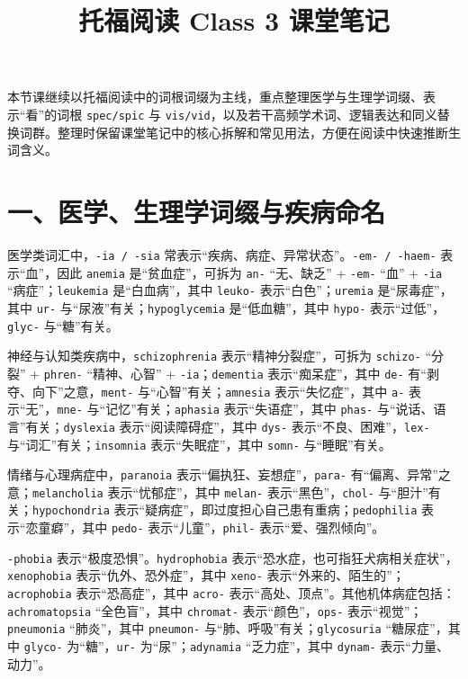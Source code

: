 \documentclass[UTF8,zihao=-4]{ctexart}
\title{\heiti 托福阅读 Class 3 课堂笔记}
\author{}
\date{}
\begin{document}
\maketitle
\thispagestyle{fancy}

本节课继续以托福阅读中的词根词缀为主线，重点整理医学与生理学词缀、表示“看”的词根 \texttt{spec/spic} 与 \texttt{vis/vid}，以及若干高频学术词、逻辑表达和同义替换词群。整理时保留课堂笔记中的核心拆解和常见用法，方便在阅读中快速推断生词含义。

\section*{一、医学、生理学词缀与疾病命名}

医学类词汇中，\texttt{-ia / -sia} 常表示“疾病、病症、异常状态”。\texttt{-em- / -haem-} 表示“血”，因此 \texttt{anemia} 是“贫血症”，可拆为 \texttt{an-} “无、缺乏” + \texttt{-em-} “血” + \texttt{-ia} “病症”；\texttt{leukemia} 是“白血病”，其中 \texttt{leuko-} 表示“白色”；\texttt{uremia} 是“尿毒症”，其中 \texttt{ur-} 与“尿液”有关；\texttt{hypoglycemia} 是“低血糖”，其中 \texttt{hypo-} 表示“过低”，\texttt{glyc-} 与“糖”有关。

神经与认知类疾病中，\texttt{schizophrenia} 表示“精神分裂症”，可拆为 \texttt{schizo-} “分裂” + \texttt{phren-} “精神、心智” + \texttt{-ia}；\texttt{dementia} 表示“痴呆症”，其中 \texttt{de-} 有“剥夺、向下”之意，\texttt{ment-} 与“心智”有关；\texttt{amnesia} 表示“失忆症”，其中 \texttt{a-} 表示“无”，\texttt{mne-} 与“记忆”有关；\texttt{aphasia} 表示“失语症”，其中 \texttt{phas-} 与“说话、语言”有关；\texttt{dyslexia} 表示“阅读障碍症”，其中 \texttt{dys-} 表示“不良、困难”，\texttt{lex-} 与“词汇”有关；\texttt{insomnia} 表示“失眠症”，其中 \texttt{somn-} 与“睡眠”有关。

情绪与心理病症中，\texttt{paranoia} 表示“偏执狂、妄想症”，\texttt{para-} 有“偏离、异常”之意；\texttt{melancholia} 表示“忧郁症”，其中 \texttt{melan-} 表示“黑色”，\texttt{chol-} 与“胆汁”有关；\texttt{hypochondria} 表示“疑病症”，即过度担心自己患有重病；\texttt{pedophilia} 表示“恋童癖”，其中 \texttt{pedo-} 表示“儿童”，\texttt{phil-} 表示“爱、强烈倾向”。

\texttt{-phobia} 表示“极度恐惧”。\texttt{hydrophobia} 表示“恐水症，也可指狂犬病相关症状”，\texttt{xenophobia} 表示“仇外、恐外症”，其中 \texttt{xeno-} 表示“外来的、陌生的”；\texttt{acrophobia} 表示“恐高症”，其中 \texttt{acro-} 表示“高处、顶点”。其他机体病症包括：\texttt{achromatopsia} “全色盲”，其中 \texttt{chromat-} 表示“颜色”，\texttt{ops-} 表示“视觉”；\texttt{pneumonia} “肺炎”，其中 \texttt{pneumon-} 与“肺、呼吸”有关；\texttt{glycosuria} “糖尿症”，其中 \texttt{glyco-} 为“糖”，\texttt{ur-} 为“尿”；\texttt{adynamia} “乏力症”，其中 \texttt{dynam-} 表示“力量、动力”。
\end{document}

